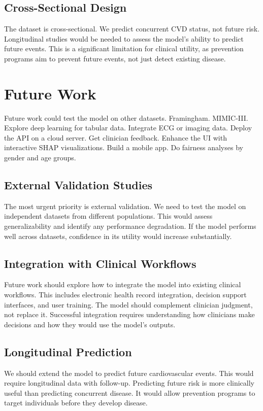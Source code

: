 \documentclass[12pt, a4paper, oneside]{book}
\begin{document}
\subsection{Cross-Sectional Design}
The dataset is cross-sectional. We predict concurrent CVD status, not future risk. Longitudinal studies would be needed to assess the model's ability to predict future events. This is a significant limitation for clinical utility, as prevention programs aim to prevent future events, not just detect existing disease.

\section{Future Work}
Future work could test the model on other datasets. Framingham. MIMIC-III. Explore deep learning for tabular data. Integrate ECG or imaging data. Deploy the API on a cloud server. Get clinician feedback. Enhance the UI with interactive SHAP visualizations. Build a mobile app. Do fairness analyses by gender and age groups.

\subsection{External Validation Studies}
The most urgent priority is external validation. We need to test the model on independent datasets from different populations. This would assess generalizability and identify any performance degradation. If the model performs well across datasets, confidence in its utility would increase substantially.

\subsection{Integration with Clinical Workflows}
Future work should explore how to integrate the model into existing clinical workflows. This includes electronic health record integration, decision support interfaces, and user training. The model should complement clinician judgment, not replace it. Successful integration requires understanding how clinicians make decisions and how they would use the model's outputs.

\subsection{Longitudinal Prediction}
We should extend the model to predict future cardiovascular events. This would require longitudinal data with follow-up. Predicting future risk is more clinically useful than predicting concurrent disease. It would allow prevention programs to target individuals before they develop disease.
\end{document}

